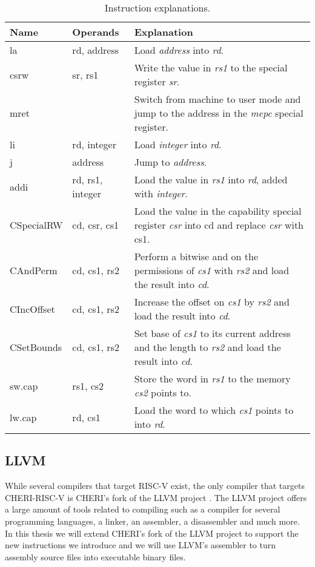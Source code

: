 \begin{table}[ht]
\centering
\begin{tabular}{|l|l|p{8cm}|}
\hline
Name & Operands & Explanation \\
\hline
la & rd, address & Load \textit{address} into \textit{rd}. \\
csrw & sr, rs1 & Write the value in \textit{rs1} to the special register \textit{sr}. \\
mret & & Switch from machine to user mode and jump to the address in the \textit{mepc} special register.\\
li & rd, integer & Load \textit{integer} into \textit{rd}. \\
j & address & Jump to \textit{address}. \\
addi & rd, rs1, integer & Load the value in \textit{rs1} into \textit{rd}, added with \textit{integer}. \\
\hline
CSpecialRW & cd, csr, cs1 & Load the value in the capability special register \textit{csr} into {cd} and replace \textit{csr} with {cs1}. \\
CAndPerm & cd, cs1, rs2 & Perform a bitwise and on the permissions of \textit{cs1} with \textit{rs2} and load the result into \textit{cd}. \\
CIncOffset & cd, cs1, rs2 & Increase the offset on \textit{cs1} by \textit{rs2} and load the result into \textit{cd}. \\
CSetBounds & cd, cs1, rs2 & Set base of \textit{cs1} to its current address and the length to \textit{rs2} and load the result into \textit{cd}. \\
sw.cap & rs1, cs2 & Store the word in \textit{rs1} to the memory \textit{cs2} points to. \\
lw.cap & rd, cs1 & Load the word to which \textit{cs1} points to into \textit{rd}. \\
\hline
\end{tabular}
\caption{Instruction explanations.}
\label{table:riscvinsts}
\end{table}

\subsection{LLVM}
\label{sec:llvm_background}
While several compilers that target RISC-V exist, the only compiler that targets CHERI-RISC-V is CHERI's fork of the LLVM project \cite{cherillvm}.
The LLVM project offers a large amount of tools related to compiling such as a compiler for several programming languages, a linker, an assembler, a disassembler and much more.
In this thesis we will extend CHERI's fork of the LLVM project to support the new instructions we introduce and we will use LLVM's assembler to turn assembly source files into executable binary files.

